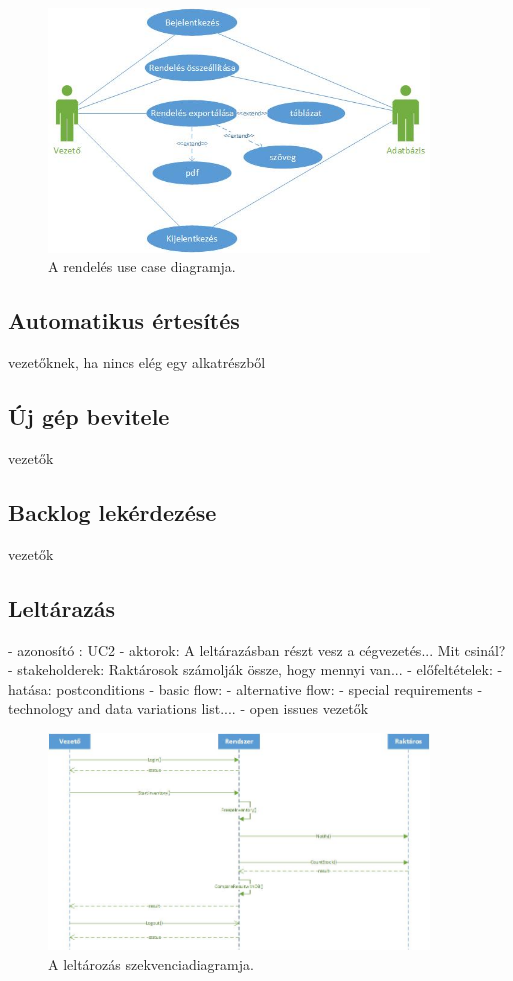 \documentclass[11pt]{article}\usepackage[left=20mm,right=20mm,top=15mm,bottom=20mm]{geometry}
\begin{document}
\begin{figure}[!h]
    \centering
        \includegraphics[width=0.9\textwidth]{figures/rendeles_UC.jpg}
        \caption{A rendelés use case diagramja.}
\end{figure}

\subsection{Automatikus értesítés}
vezetőknek, ha nincs elég egy alkatrészből

\subsection{Új gép bevitele}
vezetők

\subsection{Backlog lekérdezése}
vezetők

\subsection{Leltárazás}
- azonosító : UC2
- aktorok: A leltárazásban részt vesz a cégvezetés... Mit csinál?
- stakeholderek: Raktárosok számolják össze, hogy mennyi van...
- előfeltételek:
- hatása: postconditions
- basic flow:
- alternative flow:
- special requirements
- technology and data variations list.... 
- open issues
vezetők

\begin{figure}[!h]
    \centering
        \includegraphics[width=0.9\textwidth]{figures/leltarazas_SD.jpg}
        \caption{A leltározás szekvenciadiagramja.}
\end{figure}
\end{document}
